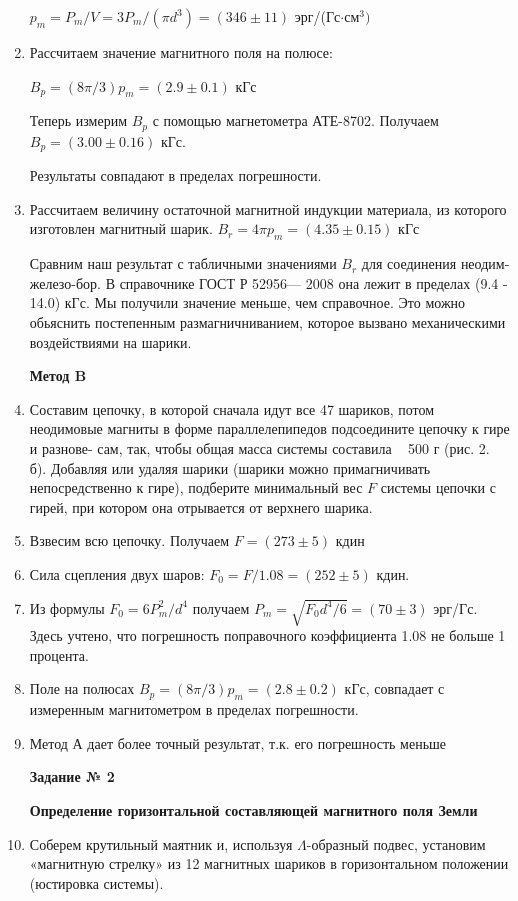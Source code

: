 \documentclass[a4paper, 12pt]{article}
\begin{document}
\begin{enumerate}
$p_m = P_m/V =3 P_m/(\pi d^3) = (346\pm11)$ эрг/(Гс$\cdot \text{см}^3)$
\item
Рассчитаем значение магнитного поля на полюсе:

$B_{p}=(8 \pi / 3) {p}_{m}=(2.9\pm0.1)$ кГс

Теперь измерим $B_p$ с помощью магнетометра АТЕ-8702. Получаем $B_p = (3.00\pm0.16)$ кГс.

Результаты совпадают в пределах погрешности.
\item
Рассчитаем величину остаточной магнитной индукции материала, из которого изготовлен магнитный шарик. $B_r = 4 \pi p_m = (4.35\pm0.15)$ кГс

Сравним наш результат с табличными значениями $B_r$ для соединения неодим-железо-бор. В справочнике ГОСТ Р 52956— 2008 она лежит в пределах (9.4 - 14.0) кГс. Мы получили значение меньше, чем справочное. Это можно обьяснить постепенным размагничниванием, которое вызвано механическими воздействиями на шарики.

\large{\textbf{Метод B}}
\item 
Составим цепочку, в которой сначала идут все 47 шариков, потом неодимовые магниты в форме параллелепипедов подсоедините цепочку к гире и разнове- сам, так, чтобы общая масса системы составила ~ 500 г (рис. 2. б). Добавляя или удаляя шарики (шарики можно примагничивать непосредственно к гире), подберите минимальный вес $F$ системы цепочки с гирей, при котором она отрывается от верхнего шарика.
\item
Взвесим всю цепочку. Получаем $F = (273\pm5)$ кдин
\item
Сила сцепления двух шаров: $F_0 = F/1.08 = (252\pm5)$ кдин.
\item
Из формулы $F_{0}=6 P_{m}^{2} / d^{4}$ получаем $P_m = \sqrt{F_0 d^4/6} = (70\pm3)$ эрг/Гс. Здесь учтено, что погрешность поправочного коэффициента 1.08 не больше 1 процента.
\item
Поле на полюсах $B_{p}=(8 \pi / 3) {p}_{m}=(2.8\pm0.2)$ кГс, совпадает с измеренным магнитометром в пределах погрешности.
\item
Метод А дает более точный результат, т.к. его погрешность меньше

\large{\textbf{Задание № 2}}

\textbf{Определение горизонтальной составляющей магнитного поля Земли}

\item Соберем крутильный маятник и, используя $\Lambda$-образный подвес, установим «магнитную стрелку» из 12 магнитных шариков в горизонтальном положении (юстировка системы).


\end{enumerate}
\end{document}
